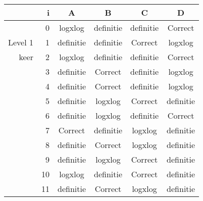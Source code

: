\begin{tabular}{ rr| c|c|c|c}\hline\hline
     & i & \textbf{A} & \textbf{B} & \textbf{C} & \textbf{D}\\\hline

&0&logxlog&definitie&definitie&Correct\cellcolor[gray]{0.6}\\
Level 1 & 1&definitie&definitie&Correct\cellcolor[gray]{0.6}&logxlog\\
keer &2&logxlog&definitie&definitie&Correct\cellcolor[gray]{0.6}\\
&3&definitie&Correct\cellcolor[gray]{0.6}&definitie&logxlog\\
&4&definitie&Correct\cellcolor[gray]{0.6}&definitie&logxlog\\
&5&definitie&logxlog&Correct\cellcolor[gray]{0.6}&definitie\\
&6&definitie&logxlog&definitie&Correct\cellcolor[gray]{0.6}\\
&7&Correct\cellcolor[gray]{0.6}&definitie&logxlog&definitie\\
&8&definitie&Correct\cellcolor[gray]{0.6}&logxlog&definitie\\
&9&definitie&logxlog&Correct\cellcolor[gray]{0.6}&definitie\\
&10&logxlog&definitie&Correct\cellcolor[gray]{0.6}&definitie\\
&11&definitie&Correct\cellcolor[gray]{0.6}&logxlog&definitie\\
\hline\end{tabular}\par\ \newline

